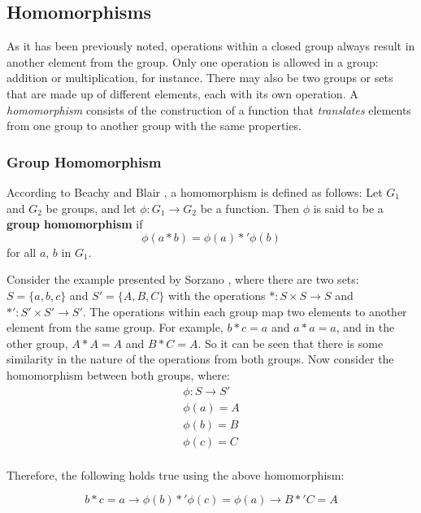 \subsection{Homomorphisms}

As it has been previously noted, operations within a closed group always result in another element from the group. Only one operation is allowed in a group: addition or multiplication, for instance. There may also be two groups or sets that are made up of different elements, each with its own operation. A \emph{homomorphism} consists of the construction of a function that \emph{translates} elements from one group to another group with the same properties.

\subsubsection{Group Homomorphism}

According to Beachy and Blair \cite{beachy2006abstract}, a homomorphism is defined as follows: Let $G_{1}$ and $G_{2}$ be groups, and let $\phi: G_{1} \rightarrow G_{2}$ be a function. Then $\phi$ is said to be a \textbf{group homomorphism} if
\begin{equation}
\phi(a*b) = \phi(a) *' \phi(b)
\end{equation}
for all $a$, $b$ in $G_{1}$.

Consider the example presented by Sorzano \cite{sorzano2013}, where there are two sets: $S= \{a, b, c\}$ and $S' = \{A, B, C\}$  with the operations $*: S \times S \rightarrow S$ and $*' : S' \times S' \rightarrow S'$. The operations within each group map two elements to another element from the same group. For example, $b*c=a$ and $a*a=a$, and in the other group, $A*A = A$ and $B*C=A$. So it can be seen that there is some similarity in the nature of the operations from both groups. Now consider the homomorphism between both groups, where:
\[
\begin{split}
  \phi: S \rightarrow S' \\
  \phi(a) = A \\
  \phi(b) = B \\
  \phi(c) = C \\
\end{split}
\]

\noindent Therefore, the following holds true using the above homomorphism:

\begin{equation}
b*c=a \rightarrow \phi(b) *' \phi(c) = \phi(a) \rightarrow B *' C = A
\end{equation}

